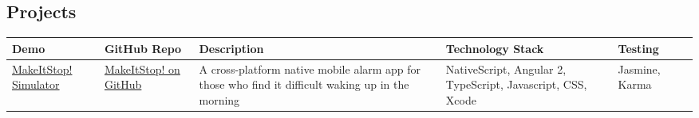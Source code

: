 \documentclass[]{article}
\begin{document}
\subsection{Projects}\label{projects}

\begin{longtable}[]{@{}llllll@{}}
\toprule
\begin{minipage}[b]{0.05\columnwidth}\raggedright\strut
Demo\strut
\end{minipage} & \begin{minipage}[b]{0.05\columnwidth}\raggedright\strut
GitHub Repo\strut
\end{minipage} & \begin{minipage}[b]{0.05\columnwidth}\raggedright\strut
Description\strut
\end{minipage} & \begin{minipage}[b]{0.05\columnwidth}\raggedright\strut
Technology Stack\strut
\end{minipage} & \begin{minipage}[b]{0.05\columnwidth}\raggedright\strut
Testing\strut
\end{minipage}\tabularnewline
\midrule
\endhead
\begin{minipage}[t]{0.05\columnwidth}\raggedright\strut
\href{https://www.youtube.com/watch?v=WGuyOzGttv0}{MakeItStop!}
\href{https://appetize.io/embed/9u8mc98n64duqbtp8puja2thhm?device=iphone6\&scale=75\&orientation=portrait\&osVersion=9.3}{Simulator}\strut
\end{minipage} & \begin{minipage}[t]{0.05\columnwidth}\raggedright\strut
\href{https://github.com/MakeItStop/task-based-alarm}{MakeItStop! on
GitHub}\strut
\end{minipage} & \begin{minipage}[t]{0.05\columnwidth}\raggedright\strut
A cross-platform native mobile alarm app for those who find it difficult
waking up in the morning\strut
\end{minipage} & \begin{minipage}[t]{0.05\columnwidth}\raggedright\strut
NativeScript, Angular 2, TypeScript, Javascript, CSS, Xcode\strut
\end{minipage} & \begin{minipage}[t]{0.05\columnwidth}\raggedright\strut
Jasmine, Karma\strut
\end{minipage} & \begin{minipage}[t]{0.05\columnwidth}\raggedright\strut
\strut
\end{minipage}\tabularnewline

\end{longtable}
\end{document}
